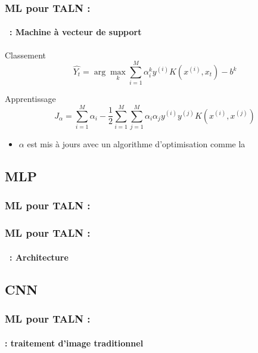 \documentclass[xcolor=table]{beamer}
\begin{document}
\begin{frame}
	\frametitle{ML pour TALN : \insertsection}
	\framesubtitle{\insertsubsection\ : Machine à vecteur de support}
	
	Classement 
	\[\hat{Y_t} = \arg\max_{k} \sum^M_{i=1} \alpha^k_i y^{(i)} K(x^{(i)}, x_t) - b^k\]
	
	Apprentissage
	\[J_\alpha = \sum\limits_{i=1}^{M} \alpha_i - \frac{1}{2} \sum\limits_{i=1}^{M} \sum\limits_{j=1}^{M} \alpha_i \alpha_j y^{(i)} y^{(j)} K(x^{(i)}, x^{(j)}) \]
	
	\begin{itemize}
		\item $\alpha$ est mis à jours avec un algorithme d'optimisation comme la 
	\end{itemize}
	
\end{frame}

\subsection{MLP}

\begin{frame}
	\frametitle{ML pour TALN : \insertsection}
	\framesubtitle{\insertsubsection}
	
	
\end{frame}

\begin{frame}
	\frametitle{ML pour TALN : \insertsection}
	\framesubtitle{\insertsubsection\ : Architecture}
	
	
\end{frame}


\subsection{CNN}

\begin{frame}
	\frametitle{ML pour TALN : \insertsection}
	\framesubtitle{\insertsubsection : traitement d'image traditionnel}
	
	\begin{center}
	\end{center}
	
\end{frame}
\end{document}
